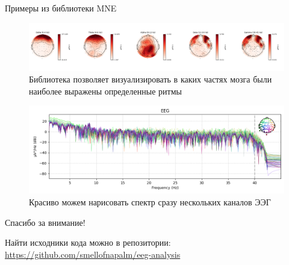 \documentclass[10pt, red]{beamer}
\begin{document}
\begin{frame}{Примеры из библиотеки MNE}

\begin{figure}[h]
    \centering
    \includegraphics[width=1\linewidth]{src/Все-ритмы-MNE.png}
    \caption{Библиотека позволяет визуализировать в каких частях мозга были наиболее выражены определенные ритмы}
    \label{pic:mne}
\end{figure}

\begin{figure}[h]
    \centering
    \includegraphics[width=1\linewidth]{src/Спектр-MNE.png}
    \caption{Красиво можем нарисовать спектр сразу нескольких каналов ЭЭГ}
    \label{pic:mne-spectrum}
\end{figure}
    
\end{frame}

\begin{frame}

\centering
{\huge
Спасибо за внимание!}

\hspace{30}

Найти исходники кода можно в репозитории:
\textcolor{blue}{\url{https://github.com/smellofnapalm/eeg-analysis}}
    
\end{frame}
\end{document}
